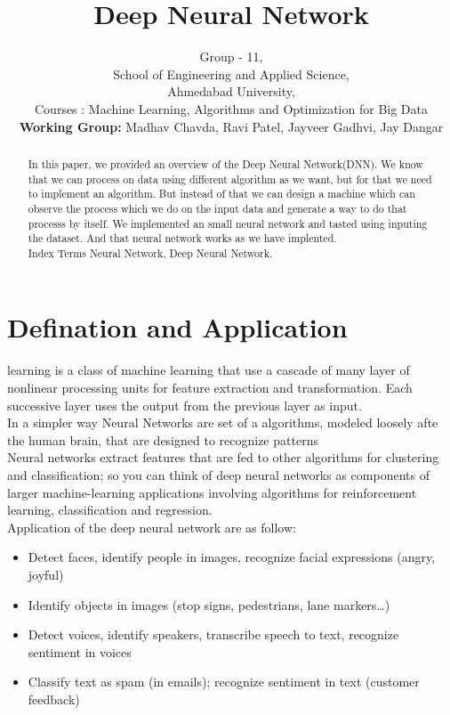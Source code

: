 \documentclass[journal, a4paper]{IEEEtran}
\begin{document}
	\title{Deep Neural Network}
	\author{Group - 11,
		\\School of Engineering and Applied Science,\\
		Ahmedabad University,\\ Courses : Machine Learning, Algorithms and Optimization for Big Data\\
		\textbf{Working Group:} Madhav Chavda, Ravi Patel, Jayveer Gadhvi, Jay Dangar
	}

	\maketitle
\begin{abstract}
	In this paper, we provided an overview of the Deep Neural Network(DNN). We know that we can process on data using different algorithm as we want, but for that we need to implement an algorithm. But instead of that we can design a machine which can observe the process which we do on the input data and generate a way to do that processs by itself. We implemented an small neural network and tasted using inputing the dataset. And that neural network works as we have implented. \\
	Index Terms \textendash Neural Network, Deep Neural Network.
\end{abstract}


\section{Defination and Application}
	 learning is a class of machine learning that use a cascade of many layer of nonlinear processing units for feature extraction and transformation. Each successive layer uses the output from the previous layer as input.\\In a simpler way Neural Networks are set of a algorithms, modeled loosely afte the human brain, that are designed to recognize patterns\\Neural networks extract features that are fed to other algorithms for clustering and classification; so you can think of deep neural networks as components of larger machine-learning applications involving algorithms for reinforcement learning, classification and regression.\\Application of the deep neural network are as follow:
	
	\begin{itemize}
	
	\item Detect faces, identify people in images, recognize facial expressions (angry, joyful)
	
	\item Identify objects in images (stop signs, pedestrians, lane markers…)
	
	\item Detect voices, identify speakers, transcribe speech to text, recognize sentiment in voices
	
	\item Classify text as spam (in emails); recognize sentiment in text (customer feedback)
	
	\end{itemize}
	
\end{document}
